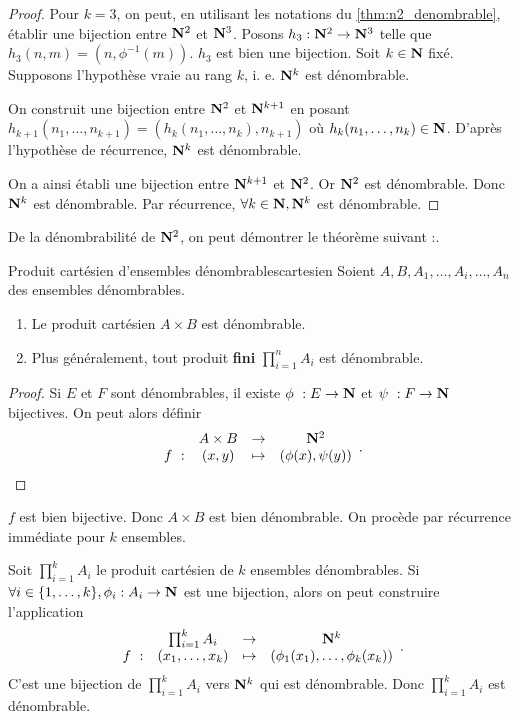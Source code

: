 \documentclass[a4paper,french,final]{memoir}
\begin{document}
\begin{proof}

  Pour $k = 3$, on peut, en utilisant les notations du \cref{thm:n2_denombrable}, établir une bijection entre $\mathbf{N}^2$ et $\mathbf{N}^3$. Posons $h_3 : \mathbf{N}^2 \to \mathbf{N}^3$ telle que $h_3(n,m) = (n,\phi^{-1}(m))$. $h_3$ est bien une bijection. Soit $k \in \mathbf{N}$ fixé. Supposons l'hypothèse vraie au rang $k$, i. e. $\mathbf{N}^k$ est dénombrable.

  On construit une bijection entre $\mathbf{N}^2$ et $\mathbf{N}^{k+1}$ en posant $h_{k+1}(n_1, \dots, n_{k+1}) = (h_k(n_1, \dots, n_k),n_{k+1})$ où $h_k(n_1, \dots, n_k) \in \mathbf{N}$. D'après l'hypothèse de récurrence, $\mathbf{N}^k$ est dénombrable.

  On a ainsi établi une bijection entre $\mathbf{N}^{k+1}$ et $\mathbf{N}^2$. Or $\mathbf{N}^2$ est dénombrable. Donc $\mathbf{N}^k$ est dénombrable. Par récurrence, $\forall k \in \mathbf{N}, \mathbf{N}^k$ est dénombrable.
\end{proof}
De la dénombrabilité de $\mathbf{N}^2$, on peut démontrer le théorème suivant :.
\begin{theoremb}{Produit cartésien d'ensembles dénombrables}{cartesien}
	Soient $A, B, A_1, \dots, A_i, \dots, A_n$ des ensembles dénombrables.
	\begin{enumerate}
		\item Le produit cartésien $A \times B$ est dénombrable.
		\item Plus généralement, tout produit \textbf{fini} $\prod_{i=1}^{n} A_i $ est dénombrable.
	\end{enumerate}
\end{theoremb}
\begin{proof}
	Si $E$ et $F$ sont dénombrables, il existe $\phi~: E \to \NN$ et $\psi~: F \to \mathbf{N}$ bijectives. On peut alors définir \[ \begin{array}{cccc}
	\ & A \times B & \to & \NN^2 \\
	f~: & (x,y) & \mapsto & (\phi(x), \psi(y))
	\end{array}.\]

\end{proof}

$f $ est bien bijective. Donc $A \times B$ est bien dénombrable. On procède par récurrence immédiate pour $k$ ensembles.

Soit $\prod_{i =1}^k A_i$ le produit cartésien de $k$ ensembles dénombrables. Si $\forall i \in \{1,\dots,k\}, \phi_i : A_i \to \NN$ est une bijection, alors on peut construire l'application \[ \begin{array}{cccc}
	\ & \prod_{i=1}^k A_i & \to & \NN^k\\
	f~: & (x_1,\dots,x_k) & \mapsto & (\phi_1(x_1),\dots, \phi_k(x_k))
	\end{array}.\]
C'est une bijection de $\prod_{i=1}^k A_i $ vers $\mathbf{N}^k$ qui est dénombrable. Donc $\prod_{i=1}^kA_i$ est dénombrable.
\end{document}
